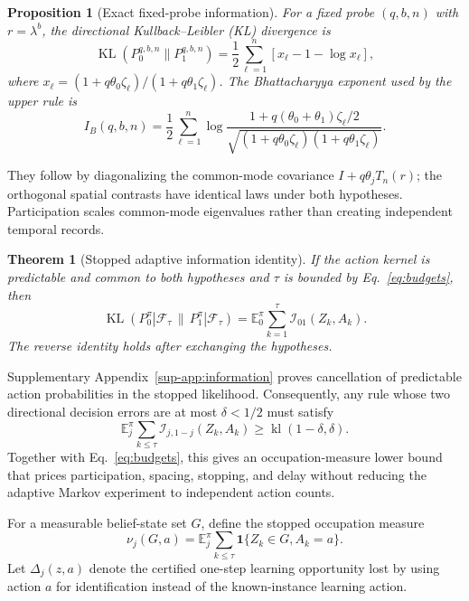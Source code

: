 \documentclass[journal]{IEEEtran}
\newtheorem{theorem}{Theorem}
\newtheorem{proposition}{Proposition}
\newcommand{\E}{\mathbb{E}}
\newcommand{\F}{\mathcal{F}}
\newcommand{\KL}{\operatorname{KL}}
\begin{document}
\begin{proposition}[Exact fixed-probe information]
For a fixed probe $(q,b,n)$ with $r=\lambda^b$, the directional Kullback--Leibler (KL) divergence is
\begin{equation}
\KL(P_0^{q,b,n}\|P_1^{q,b,n})
=\frac12\sum_{\ell=1}^n
\left[x_\ell-1-\log x_\ell\right],
\label{eq:fixed-probe-kl}
\end{equation}
where $x_\ell=(1+q\theta_0\zeta_\ell)/(1+q\theta_1\zeta_\ell)$.
The Bhattacharyya exponent used by the upper rule is
\begin{equation}
I_B(q,b,n)=\frac12\sum_{\ell=1}^n
\log\frac{1+q(\theta_0+\theta_1)\zeta_\ell/2}
{\sqrt{(1+q\theta_0\zeta_\ell)(1+q\theta_1\zeta_\ell)}}.
\label{eq:bhattacharyya}
\end{equation}
\label{prop:fixed-information}
\end{proposition}

They follow by diagonalizing the common-mode covariance $I+q\theta_jT_n(r)$; the orthogonal spatial contrasts have identical laws under both hypotheses.
Participation scales common-mode eigenvalues rather than creating independent temporal records.

\begin{theorem}[Stopped adaptive information identity]
If the action kernel is predictable and common to both hypotheses and $\tau$ is bounded by Eq.~\eqref{eq:budgets}, then
\begin{equation}
\KL(P_0^\pi|\F_\tau\,\|\,P_1^\pi|\F_\tau)=\E_0^\pi\sum_{k=1}^{\tau}\mathcal{I}_{01}(Z_k,A_k).
\label{eq:adaptive-kl}
\end{equation}
The reverse identity holds after exchanging the hypotheses.
\label{thm:adaptive-kl}
\end{theorem}
Supplementary Appendix~\ref{sup-app:information} proves cancellation of predictable action probabilities in the stopped likelihood.
Consequently, any rule whose two directional decision errors are at most $\delta<1/2$ must satisfy
\begin{equation}
\E_j^\pi\sum_{k\le\tau}\mathcal{I}_{j,1-j}(Z_k,A_k)\ge \operatorname{kl}(1-\delta,\delta).
\label{eq:info-constraint}
\end{equation}
Together with Eq.~\eqref{eq:budgets}, this gives an occupation-measure lower bound that prices participation, spacing, stopping, and delay without reducing the adaptive Markov experiment to independent action counts.

For a measurable belief-state set $G$, define the stopped occupation measure
\begin{equation}
\nu_j(G,a)=\E_j^\pi\sum_{k\le\tau}
\mathbf 1\{Z_k\in G,A_k=a\}.
\label{eq:occupation-measure}
\end{equation}
Let $\Delta_j(z,a)$ denote the certified one-step learning opportunity lost by using action $a$ for identification instead of the known-instance learning action.
\end{document}
